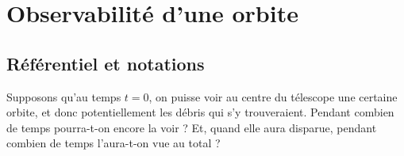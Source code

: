 \renewcommand{\phi}{\varphi}

\newcommand{\TD}{T_\text{d}}
\newcommand{\omegaD}{\omega_\text{d}}
\newcommand{\iD}{i_\text{d}}
\newcommand{\altitudeD}{r}
\newcommand{\rayonD}{\rayonT+\altitudeD}

\newcommand{\TT}{T_\text{t}}
\newcommand{\omegaT}{\omega_\text{t}}
\newcommand{\iT}{i_\text{t}}
\newcommand{\rayonT}{R}

\newcommand{\referentiel}{\mathcal{R}}

\section{Observabilité d'une orbite}

\subsection{Référentiel et notations}

Supposons qu'au temps $t=0$, on puisse voir au centre du télescope une certaine orbite, et donc potentiellement les débris qui s'y trouveraient. Pendant combien de temps pourra-t-on encore la voir ? Et, quand elle aura disparue, pendant combien de temps l'aura-t-on vue au total ?

